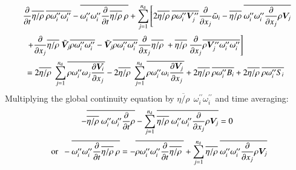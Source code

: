 \documentclass{warpdoc}
\newcommand{\alb}{\vspace{0.2cm}\\} %
\newcommand{\nd}{{{n}_{\rm d}}}
\newcommand{\mfd}{\displaystyle}
\begin{document}
%
\begin{equation}
 \begin{array}{l}
         \mfd \frac{\partial }{\partial t}  \overline{\eta/\rho}~ \overline{\rho \omega_i^{\prime\prime} \omega_i^{\prime\prime} }
         -\overline{\omega_i^{\prime\prime} \omega_i^{\prime\prime}\frac{\partial }{\partial t} \overline{\eta/\rho}~  \rho }
        +\mfd\sum_{j=1}^{\nd}
         \mfd\left[
           2 \overline{\eta/\rho}~ \overline{\rho \omega_i^{\prime\prime} \bm{V}_j^{\prime\prime}}
           \frac{\partial }{\partial x_j} {\wtilde{\omega}_i}
            -  \overline{\eta/\rho}~ \overline{\omega_i^{\prime\prime} \omega_i^{\prime\prime} \frac{\partial }{\partial x_j} \rho \bm{V}_j}
         \right.\alb~~
         \mfd\left.
            +  \frac{\partial }{\partial x_j} \overline{\eta/\rho}~ {\wtilde{\bm{V}}_j} \overline{\rho \omega_i^{\prime\prime} \omega_i^{\prime\prime}}
            -  {\wtilde{\bm{V}}_j} \overline{\rho \omega_i^{\prime\prime} \omega_i^{\prime\prime}} \frac{\partial }{\partial x_j}  \overline{\eta/\rho}~
            +   \overline{\eta/\rho}~ \frac{\partial }{\partial x_j} \overline{\rho {\bm{V}_j^{\prime\prime}} \omega_i^{\prime\prime} \omega_i^{\prime\prime}}
         \right]
    \alb~~
   =\mfd 2 \overline{\eta/\rho}~ \sum_{j=1}^\nd \overline{\rho  \omega_i^{\prime\prime}  \omega_j  \frac{\partial \bm{V}_i}{\partial x_j}}
  -2 \overline{\eta/\rho}~ \sum_{j=1}^\nd \overline{\rho  \omega_i^{\prime\prime}  \omega_i  \frac{\partial \bm{V}_j}{\partial x_j}}
  +2 \overline{\eta/\rho}~ \overline{\rho \omega_i^{\prime\prime} B_i}
  +2 \overline{\eta/\rho}~ \overline{\rho \omega_i^{\prime\prime} S_i}
 \end{array}
\label{eqn:SDR:2}
\end{equation}
%
Multiplying the global continuity equation by $\overline{\eta/\rho}~~ \omega_i^{\prime\prime} \omega_i^{\prime\prime}$ and time averaging:
%
\begin{equation}
  \begin{array}{c}
  -\mfd\overline{\overline{\eta/\rho}~ \omega_i^{\prime\prime} \omega_i^{\prime\prime}\frac{\partial }{\partial t}  \rho }
       -  \sum_{j=1}^\nd \overline{\overline{\eta/\rho}~ \omega_i^{\prime\prime} \omega_i^{\prime\prime} \frac{\partial }{\partial x_j}  \rho \bm{V}_j} = 0 \alb
  {\rm ~~or~~   }-\mfd\overline{\omega_i^{\prime\prime} \omega_i^{\prime\prime}\frac{\partial }{\partial t}  \overline{\eta/\rho}~ \rho }
       = - \overline{\rho \omega_i^{\prime\prime} \omega_i^{\prime\prime}\frac{\partial }{\partial t}  \overline{\eta/\rho}~ }
          +  \sum_{j=1}^\nd \overline{\eta/\rho}~ \overline{\omega_i^{\prime\prime} \omega_i^{\prime\prime} \frac{\partial }{\partial x_j}  \rho \bm{V}_j}
  \end{array}
\label{eqn:SDR:continuity}
\end{equation}
\end{document}
